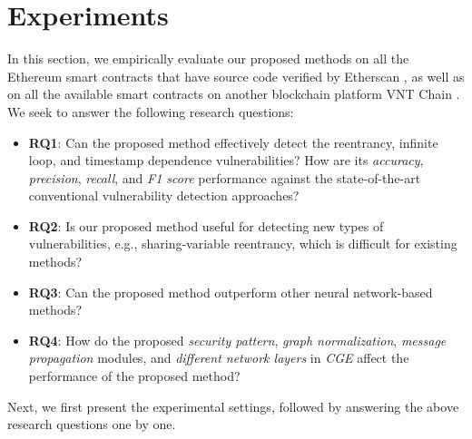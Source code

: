 \section{Experiments}
\label{experiments}
In this section, we empirically evaluate our proposed methods on all the Ethereum smart contracts that have source code verified by Etherscan \cite{Etherscan}, as well as on all the available smart contracts on another blockchain platform VNT Chain \cite{Vntchain}. We seek to answer the following research questions:
\begin{itemize}[noitemsep,wide=0pt, leftmargin=\dimexpr{} + 2\relax]
\item \textbf{RQ1}: Can the proposed method effectively detect the reentrancy, infinite loop, and timestamp dependence vulnerabilities? How are its \emph{accuracy}, \emph{precision}, \emph{recall}, and \emph{F1 score} performance against the state-of-the-art conventional vulnerability detection approaches?
\item \textbf{RQ2}: Is our proposed method useful for detecting new types of vulnerabilities, e.g., sharing-variable reentrancy, which is difficult for existing methods?
\item \textbf{RQ3}: Can the proposed method outperform other neural network-based methods? 
\item \textbf{RQ4}: How do the proposed \emph{security pattern}, \emph{graph normalization}, \emph{message propagation} modules, and \emph{different network layers} in \emph{CGE} affect the performance of the proposed method?
\end{itemize}
Next, we first present the experimental settings, followed by answering the above research questions one by one.

